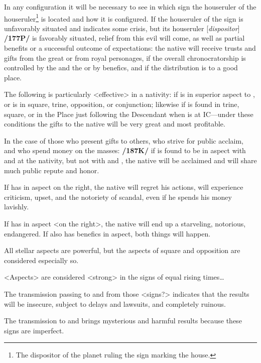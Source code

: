 In any configuration it will be necessary to see in which sign the houseruler of the houseruler\footnote{The dispositor of the planet ruling the sign marking the house.} is located and how it is configured. If the houseruler of the sign is unfavorably situated and indicates some crisis, but its houseruler [\textit{dispositor}] \textbf{/177P/} is favorably situated, relief from this evil will come, as well as partial benefits or a successful outcome of expectations: the native will receive trusts and gifts from the great or from royal personages, if the overall chronocratorship is controlled by the \Sun\xspace and the \Moon\xspace or by benefics, and if the distribution is to a good place. 


The following is particularly <effective> in a nativity: if \Jupiter\xspace is in superior aspect to \Saturn, or is in square, trine, opposition, or conjunction; likewise if \Mars\xspace is found in trine, square, or in the Place just following the Descendant when \Jupiter\xspace is at IC—under these conditions the gifts to the native will be very great and most profitable. 

In the case of those who present gifts to others, who strive for public acclaim, and who spend money on the masses: \textbf{/187K/} if \Mercury\xspace is found to be in aspect with \Jupiter\xspace and \Venus\xspace at the nativity, but not with \Saturn\xspace and \Mars, the native will be acclaimed and will share much public repute and honor. 

If \Mercury\xspace has \Mars\xspace in aspect on the right, the
native will regret his actions, will experience criticism, upset, and the notoriety of scandal, even if he spends his money lavishly. 

If \Mercury\xspace has \Saturn\xspace in aspect <on the right>, the native will end up a starveling, notorious, endangered. If \Mercury\xspace also has benefics in aspect, both things will happen.

All stellar aspects are powerful, but the aspects of square and opposition are considered especially so.

<Aspects> are considered <strong> in the signs of equal rising times\ldots

The transmission passing to \Taurus\xspace and \Virgo\xspace from those <signs?> indicates that the results will be
insecure, subject to delays and lawsuits, and completely ruinous. 

The transmission to \Sagittarius\xspace and \Capricorn\xspace brings mysterious and harmful results because these signs are imperfect.

